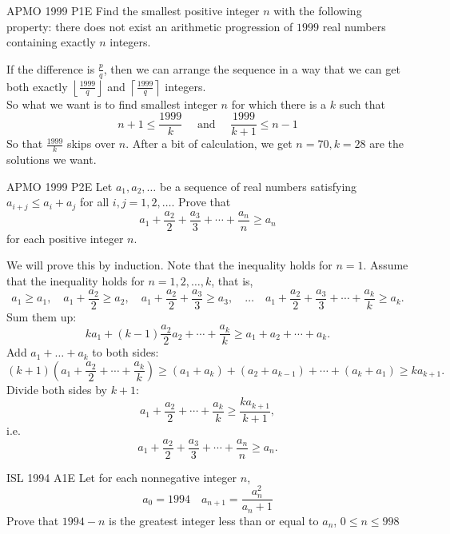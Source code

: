 {APMO 1999 P1}{E}{
    Find the smallest positive integer $n$ with the following property: there
    does not exist an arithmetic progression of $1999$ real numbers containing
    exactly $n$ integers.
}

\begin{solution}
    If the difference is $\frac{p}{q}$, then we can arrange the sequence in a
    way that we can get both exactly $\left\lfloor \frac{1999}{q} \right\rfloor$
    and $\left\lceil \frac{1999}{q} \right\rceil$ integers. \\

    So what we want is to find smallest integer $n$ for which there is a $k$
    such that
    \[n+1 \le \frac{1999}{k} \quad \text{ and } \quad \frac{1999}{k+1} \le n-1\] 
    So that $\frac{1999}{k}$ skips over $n$. After a bit of calculation, we
    get $n = 70, k = 28$ are the solutions we want.
\end{solution}


{APMO 1999 P2}{E}{
    Let $a_1, a_2, \dots$ be a sequence of real numbers satisfying $a_{i+j}
    \leq a_i+a_j$ for all $i,j=1,2,\dots$. Prove that
    \[ a_1 + \frac{a_2}{2} + \frac{a_3}{3} + \cdots + \frac{a_n}{n} \geq a_n \]
    for each positive integer $n$.
}

\begin{solution}[jgnr]
    We will prove this by induction. Note that the inequality holds for $ n=1$. Assume that the inequality holds for $ n=1,2,\ldots,k$, that is,
\[ a_1\ge a_1,\quad a_1+\frac{a_2}2\ge a_2,\quad
    a_1+\frac{a_2}{2}+\frac{a_3}3\ge a_3, \quad \dots \quad
a_1+\frac{a_2}{2}+\frac{a_3}{3}+\cdots+\frac{a_k}k\ge a_k. \]
Sum them up:
\[ ka_1+(k-1)\frac{a_2}2a_2+\cdots+\frac{a_k}{k}\ge a_1+a_2+\cdots+a_k. \]Add $ a_1+\ldots+a_k$ to both sides:
\[ (k+1)\left(a_1+\frac{a_2}2+\cdots+\frac{a_k}k\right)\ge (a_1+a_k)+(a_2+a_{k-1})+\cdots+(a_k+a_1)\ge ka_{k+1}. \]
Divide both sides by $ k+1$:
\[ a_1+\frac{a_2}2+\cdots+\frac{a_k}k\ge\frac{ka_{k+1}}{k+1}, \] i.e.
\[ a_1 + \frac{a_2}{2} + \frac{a_3}{3} + \cdots + \frac{a_n}{n} \geq a_n. \]
\end{solution}


{ISL 1994 A1}{E}{
    Let for each nonnegative integer $ n$, 
    \[ a_{0} = 1994 \quad a_{n + 1} = \frac {a_{n}^{2}}{a_{n} + 1}\] 
    Prove that $ 1994 - n$ is the greatest integer less than or equal to $
    a_{n}$, $ 0 \leq n \leq 998$
}

